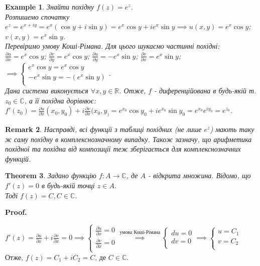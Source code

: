 \documentclass[a4paper, 10pt]{article}
\makeatletter
\def\qed{$\blacksquare$}
\theoremstyle{theoremdd}
\newtheorem{theorem}{Theorem}[subsection]
\theoremstyle{theoremdd}
\theoremstyle{theoremdd}
\theoremstyle{theoremdd}
\newtheorem{example}[theorem]{Example}
\theoremstyle{theoremdd}
\theoremstyle{theoremdd}
\newtheorem{remark}[theorem]{Remark}
\theoremstyle{theoremdd}
\theoremstyle{theoremdd}
\renewenvironment{proof}[1][Proof.\\]{\par
\pushQED{\hfill \qed}%
\normalfont \topsep6\p@\@plus6\p@\relax
\trivlist
\item\relax
{\bfseries
#1\@addpunct{.}}\hspace\labelsep\ignorespaces
}{%
\popQED\endtrivlist\@endpefalse
}
\makeatother
\begin{document}
\begin{example}
Знайти похідну $f(z)=e^z$.\\
Розпишемо спочатку $\displaystyle e^z=e^{x+iy}=e^x(\cos y+i \sin y)=e^x \cos y +i e^x \sin y \implies u(x,y)=e^x \cos y$; $v(x,y) = e^x \sin y$.\\
Перевіримо умову Коші-Рімана. Для цього шукаємо частинні похідні:\\
$\displaystyle\frac{\partial u}{\partial x}=e^x \cos y$; 
$\displaystyle\frac{\partial v}{\partial y}=e^x \cos y$; 
$\displaystyle\frac{\partial u}{\partial y}=-e^x \sin y$; 
$\displaystyle\frac{\partial v}{\partial x}=e^x \sin y$;
\\$\implies \begin{cases}
\displaystyle e^x \cos y = e^x \cos y \\
\displaystyle -e^x \sin y = -(e^x \sin y)\\
\end{cases}$.\\
Дана система виконується $\forall x,y \in \mathbb{R}$. Отже, $f$ - диференційована в будь-якій т. $z_0 \in \mathbb{C}$, а її похідна дорівнює:\\
$\displaystyle f'(z_0)=\frac{\partial u}{\partial x}(x_0,y_0) + i\frac{\partial v}{\partial x}(x_0,y_) = e^{x_0} \cos y_0 + ie^{x_0} \sin y_0 = e^{x_0} e^{iy_0} = e^{z_0}$.
\end{example}

\begin{remark}
Насправді, всі функції з таблиці похідних (не лише $e^z$) мають таку ж саму похідну в комплекснозначному випадку. Також зазначу, що арифметика похідної та похідна від композиції теж зберігається для комплекснозначних функцій.
\end{remark}

\begin{theorem}
Задано функцію $f: A \to \mathbb{C}$, де $A$ - відкрита множина. Відомо, що $f'(z) = 0$ в будь-якій точці $z \in A$. \\ Тоді $f(z)=C, C \in \mathbb{C}$.
\end{theorem}

\begin{proof}
$\displaystyle f'(z)=\frac{\partial u}{\partial x} + i\frac{\partial v}{\partial x} = 0 \implies \begin{cases}
	\displaystyle\frac{\partial u}{\partial x}=0\\
	\displaystyle\frac{\partial v}{\partial x}=0\\
	\end{cases} \overset{\textrm{умова Коші-Рімана}}{\implies}
	\begin{cases}
	du=0\\
	dv=0\\
	\end{cases} \implies
	\begin{cases}
	u=C_1\\
	v=C_2\\
	\end{cases}
	$\\
Отже, $f(z)=C_1 + i C_2 = C$, де $C \in \mathbb{C}$.
\end{proof}
\end{document}
